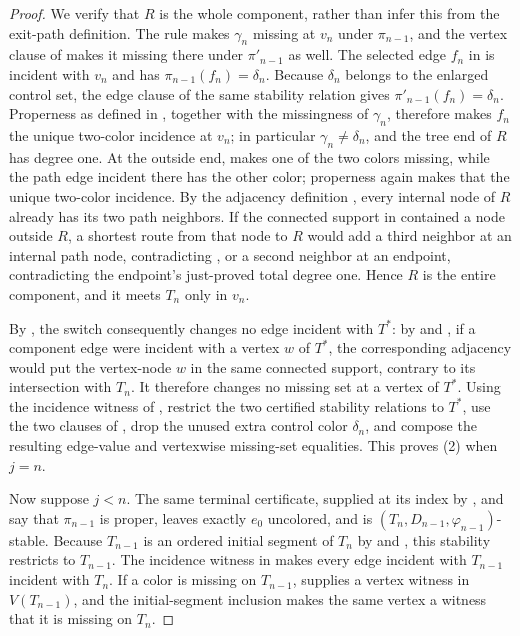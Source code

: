\begin{proof}
We verify that \(R\) is the whole component, rather than infer this from
the exit-path definition.  The rule 
makes \(\gamma_n\) missing at \(v_n\) under \(\pi_{n-1}\), and the vertex
clause of  makes it missing there under
\(\pi'_{n-1}\) as well.  The selected edge \(f_n\) in
 is incident with \(v_n\) and has
\(\pi_{n-1}(f_n)=\delta_n\).  Because \(\delta_n\) belongs to the enlarged
control set, the edge clause of the same stability relation gives
\(\pi'_{n-1}(f_n)=\delta_n\).  Properness as defined in
, together with the missingness of
\(\gamma_n\), therefore makes \(f_n\) the unique two-color incidence at
\(v_n\); in particular \(\gamma_n\ne\delta_n\), and the tree end of \(R\)
has degree one.  At the outside end,
 makes one of the two colors missing, while the path
edge incident there has the other color; properness again makes that the
unique two-color incidence.  By the adjacency definition
, every internal node of \(R\) already has
its two path neighbors.  If the connected support in
 contained a node outside \(R\), a shortest route
from that node to \(R\) would add a third neighbor at an internal path node,
contradicting
, or a second neighbor at an
endpoint, contradicting the endpoint's just-proved total degree one.  Hence
\(R\) is the entire component, and it meets \(T_n\) only in \(v_n\).

By , the switch consequently changes no
edge incident with \(T^*\): by  and
, if a component edge were incident with a
vertex \(w\) of \(T^*\), the corresponding adjacency would put the
vertex-node \(w\) in the same connected support, contrary to its intersection
with \(T_n\).  It therefore changes no missing set at a vertex of \(T^*\).
Using the incidence witness of , restrict the two
certified stability relations to \(T^*\), use the two clauses of
, drop the unused extra control color \(\delta_n\),
and compose the resulting edge-value and vertexwise missing-set equalities.
This proves (2) when \(j=n\).

Now suppose \(j<n\).  The same terminal certificate, supplied at its index
by , and  say that
\(\pi_{n-1}\) is proper, leaves
exactly \(e_0\) uncolored, and is
\((T_n,D_{n-1},\varphi_{n-1})\)-stable.  Because \(T_{n-1}\) is an ordered
initial segment of \(T_n\) by  and
, this stability restricts to
\(T_{n-1}\).  The incidence witness in  makes
every edge incident with \(T_{n-1}\) incident with \(T_n\).  If a color is
missing on \(T_{n-1}\),  supplies a vertex
witness in \(V(T_{n-1})\), and the initial-segment inclusion makes the same
vertex a witness that it is missing on \(T_n\).


\end{proof}
